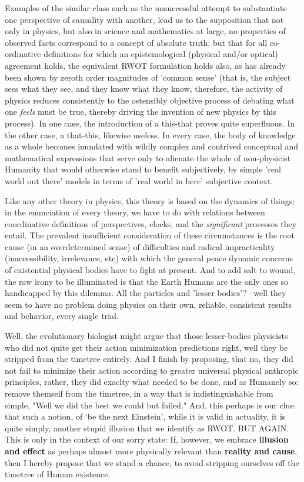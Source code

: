 \documentclass{article}
\begin{document}
Examples of the similar class such as the unsuccessful attempt to substantiate one perspective of causality with another, lead us to the supposition that not only in physics, but also in science and mathematics at large, no properties of observed facts  correspond to a concept of absolute truth; but that for all co-ordinative definitions for which an epistemological (physical and/or optical) agreement holds, the equivalent RWOT formulation holds also, as has already been shown by zeroth order magnitudes of 'common sense' (that is, the subject sees what they see, and they know what they know, therefore, the activity of physics reduces consistently to the ostensibly objective process of debating what one {\em feels} must be true, thereby driving the invention of new physics by this process). In one case, the introduction of a this-that proves quite superfluous. In the other case, a that-this, likewise useless. In every case, the body of knowledge as a whole becomes inundated with wildly complex and contrived conceptual and mathematical expressions that serve only to alienate the whole of non-physicist Humanity that would otherwise stand to benefit subjectively, by simple 'real world out there' models in terms of 'real world in here' subjective context.

Like any other theory in physics, this theory is based on the dynamics of things; in the enunciation of every theory, we have to do with relations between coordinative definitions of perspectives, clocks, and the {\em significant} processes they entail. The prevalent insufficient consideration of these circumstances is the root cause (in an overdetermined sense) of difficulties and radical impracticality (inaccessibility, irrelevance, etc) with which the general peace dynamic concerns of existential physical bodies have to fight at present. And to add salt to wound, the raw irony to be illuminated is that the Earth Humans are the only ones so handicapped by this dilemma. All the particles and 'lesser bodies'? --well they seem to have no problem doing physics on their own, reliable, consistent results and behavior, every single trial.

Well, the evolutionary biologist might argue that those lesser-bodies physicists who did not quite get their action minimization predictions right, well they be stripped from the timetree entirely. And I finish by proposing, that no, they did not fail to minimize their action according to greater universal physical anthropic principles, rather, they did exaclty what needed to be done, and as Humanely so: remove themself from the timetree, in a way that is indistinguishable from simple, "Well we did the best we could but failed." And, this perhaps is our clue: that such a notion, of `be the next Einstein', while it is valid in actuality, it is quite simply, another stupid illusion that we identify as RWOT. BUT AGAIN. This is only in the context of our sorry state: If, however, we embrace {\bf illusion and effect} as perhaps almost more physically relevant than {\bf reality and cause}, then I hereby propose that we stand a chance, to avoid stripping ourselves off the timetree of Human existence.
\end{document}
